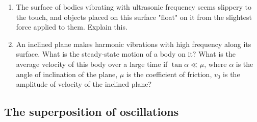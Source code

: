 \documentclass{article}
\begin{document}
\begin{enumerate}[label=3.3.\arabic*]
\item The surface of bodies vibrating with ultrasonic frequency seems slippery to the touch, and objects placed on this surface "float" on it from the slightest force applied to them. Explain this.

\item An inclined plane makes harmonic vibrations with high frequency along its surface. What is the steady-state motion of a body on it? What is the average velocity of this body over a large time if $\tan{\alpha} \ll \mu$, where $\alpha$ is the angle of inclination of the plane, $\mu$ is the coefficient of friction, $v_0$ is the amplitude of velocity of the inclined plane?


\end{enumerate}

\subsection{The superposition of oscillations}
\end{document}
